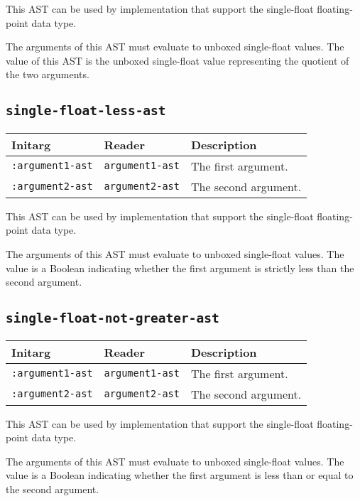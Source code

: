 This AST can be used by implementation that support the single-float
floating-point data type.  

The arguments of this AST must evaluate to unboxed single-float
values.  The value of this AST is the unboxed single-float value
representing the quotient of the two arguments.

\subsection{\texttt{single-float-less-ast}}
\label{sec-ast-single-float-less}

\begin{tabular}{|l|l|l|}
\hline
Initarg & Reader & Description\\
\hline\hline
\texttt{:argument1-ast} & \texttt{argument1-ast} & The first argument.\\
\hline
\texttt{:argument2-ast} & \texttt{argument2-ast} & The second argument.\\
\hline
\end{tabular}

This AST can be used by implementation that support the single-float
floating-point data type.  

The arguments of this AST must evaluate to unboxed single-float
values.  The value is a Boolean indicating whether the first argument
is strictly less than the second argument.

\subsection{\texttt{single-float-not-greater-ast}}
\label{sec-ast-single-float-not-greater}

\begin{tabular}{|l|l|l|}
\hline
Initarg & Reader & Description\\
\hline\hline
\texttt{:argument1-ast} & \texttt{argument1-ast} & The first argument.\\
\hline
\texttt{:argument2-ast} & \texttt{argument2-ast} & The second argument.\\
\hline
\end{tabular}

This AST can be used by implementation that support the single-float
floating-point data type.  

The arguments of this AST must evaluate to unboxed single-float
values.  The value is a Boolean indicating whether the first argument
is less than or equal to the second argument.

